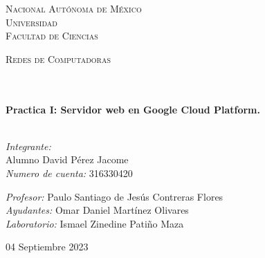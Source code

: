 \documentclass[14pt]{book}
\begin{document}
\begin{center}
\begin{minipage}{0.48\textwidth}
\begin{flushright}
    \end{flushright}
  \end{minipage}
  \vspace*{-1.5cm}
  \textsc{\huge Nacional Autónoma de México \\ \vspace{-4px} Universidad }\\[2cm]
  \textsc{\LARGE Facultad de Ciencias}\\[1.5cm]
  \begin{minipage}{0.9\textwidth}
    \begin{center}
      \textsc{\LARGE Redes de Computadoras}
    \end{center}
  \end{minipage}\\[0.5cm]
  \vspace*{1cm}
  \HRule \\[0.4cm]
  { \huge \bfseries Practica I: Servidor web en Google Cloud Platform.}\\[0.4cm]
  \HRule \\[1.5cm]
  \begin{minipage}{0.52\textwidth}
    \begin{flushleft} \large \small \vspace{-0.6cm} \vspace{-0.6cm}
      \emph{Integrante:}\\
      Alumno David Pérez Jacome \\
      \emph{Numero de cuenta:} 316330420 \vspace*{2cm}
    \end{flushleft}
  \end{minipage}
  \begin{minipage}{0.46\textwidth}
    \vspace{-0.6cm}
    \begin{flushright} \large \small \emph{Profesor:}
      Paulo Santiago de Jesús Contreras Flores	 \\
      \emph{Ayudantes:}
      Omar Daniel Martínez Olivares\\

      \emph{Laboratorio:}
      Ismael Zinedine Patiño Maza\\
    \end{flushright}
  \end{minipage}
  \vspace*{1cm}
  \vspace{2cm}
  \begin{center}
    {\large 04 Septiembre 2023}
  \end{center}
\end{center}
\end{document}
